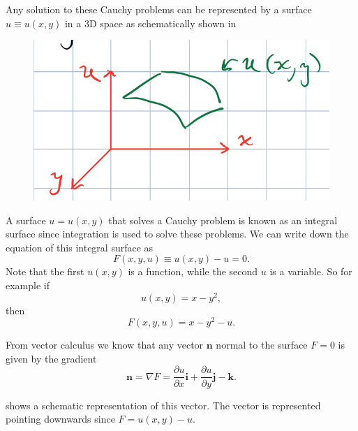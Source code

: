Any solution to these Cauchy problems can be represented by a surface $u \equiv
u(x, y)$ in a 3D space as schematically shown in 
\begin{figure}[h!]
	\centering \includegraphics[scale=.75]{fig/fig1_method_characteristics.png}
	\caption{}
	\label{fig_integral_surface}
\end{figure}

A surface $u = u(x, y)$ that solves a Cauchy problem is known as an integral
surface since integration is used to solve these problems. We can write down the
equation of this integral surface as
\begin{equation}
  F(x, y, u) \equiv u(x, y) - u = 0.
\end{equation}
Note that the first $u(x, y)$ is a function, while the second $u$ is a
variable. So for example if
\begin{equation}
  u(x, y) = x - y^2,
\end{equation}
then
\begin{equation}
  F(x, y, u) = x - y^2 - u.
\end{equation}

From vector calculus we know that any vector $\mathbf{n}$ normal to the surface $F = 0$ is given by the gradient
\begin{equation}
  \mathbf{n} = \nabla F =
  \frac{\partial u}{\partial x} \mathbf{i}
  + \frac{\partial u}{\partial y} \mathbf{j}
  - \mathbf{k}.
\end{equation}

 shows a schematic representation of this vector. The
vector is represented pointing downwards since $F = u(x, y) - u$.

